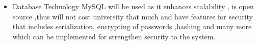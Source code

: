 \begin{enumerate}
\begin{itemize}
					\item{Database Technology}
					MySQL will be used as it enhances scalability , is open source ,thus will not cost university that 					much and have features for security that includes serialization, encrypting of passwords ,hashing 						and many more which can be implemented for strengthen security to the system.
	\end{itemize}
		
					
				
				
	\end{enumerate}

%
